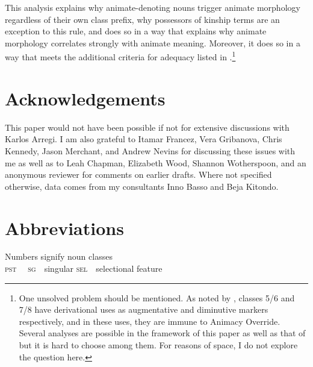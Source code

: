 \documentclass[output=paper,newtxmath,modfonts,nonflat,hidelinks]{langsci/langscibook}
\begin{document}
This analysis explains why animate-denoting nouns trigger animate morphology regardless of their own class prefix, why possessors of kinship terms are an exception to this rule, and does so in a way that explains why animate morphology correlates strongly with animate meaning. Moreover, it does so in a way that meets the additional criteria for adequacy listed in .\footnote{One unsolved problem should be mentioned.  As noted by \citet{carstens91}, classes 5/6 and 7/8 have derivational uses as augmentative and diminutive markers respectively, and in these uses, they are immune to Animacy Override.  Several analyses are possible in the framework of this paper as well as that of \citet{carstens91} but it is hard to choose among them.  For reasons of space, I do not explore the question here.}

 
 
 \section*{Acknowledgements} \label{sec:pesetsky:acknowledgements}

This paper would not have been possible if not for extensive discussions with Karlos Arregi. I am also grateful to Itamar Francez, Vera Gribanova, Chris Kennedy, Jason Merchant, and Andrew Nevins for discussing these issues with me as well as to Leah Chapman, Elizabeth Wood, Shannon Wotherspoon, and an anonymous reviewer for comments on earlier drafts.  Where not specified otherwise, data comes from my consultants Inno Basso and Beja Kitondo.

\section*{Abbreviations} \label{sec:pesetsky:abbreviations}


\noindent Numbers signify noun classes \\ \noindent \textsc{pst}~~ \hfill \textsc{sg}~~singular \hfill \textsc{sel}~~selectional feature   

\sloppy
\printbibliography[heading=subbibliography,notkeyword=this]
\end{document}
